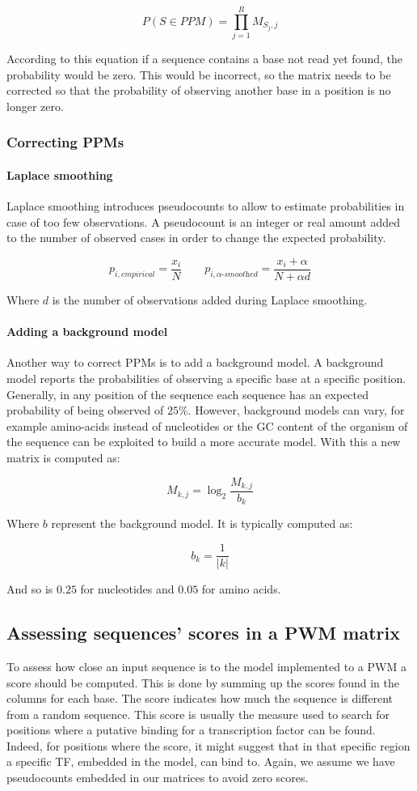 		$$P(S \in PPM) = \prod\limits_{j=1}^R M_{S_j, j}$$

		According to this equation if a sequence contains a base not read yet found, the probability would be zero.
		This would be incorrect, so the matrix needs to be corrected so that the probability of observing another base in a position is no longer zero.

		\subsubsection{Correcting PPMs}

			\paragraph{Laplace smoothing}
			Laplace smoothing introduces pseudocounts to allow to estimate probabilities in case of too few observations.
			A pseudocount is an integer or real amount added to the number of observed cases in order to change the expected probability.

			$$p_{i,\textit{empirical}} = \frac{x_i}{N} \qquad p_{i,\alpha\textit{-smoothed}} = \frac{x_i + \alpha}{N + \alpha d}$$

			Where $d$ is the number of observations added during Laplace smoothing.

			\paragraph{Adding a background model}
			Another way to correct PPMs is to add a background model.
			A background model reports the probabilities of observing a specific base at a specific position.
			Generally, in any position of the sequence each sequence has an expected probability of being observed of $25\%$.
			However, background models can vary, for example amino-acids instead of nucleotides or the GC content of the organism of the sequence can be exploited to build a more accurate model.
			With this a new matrix is computed as:

			$$M_{k,j} = \log_2\frac{M_{k,j}}{b_k}$$


			Where $b$ represent the background model.
			It is typically computed as:

			$$b_k = \frac{1}{|k|}$$

			And so is $0.25$ for nucleotides and $0.05$ for amino acids.

		\subsection{Assessing sequences' scores in a PWM matrix}
		To assess how close an input sequence is to the model implemented to a PWM a score should be computed.
		This is done by summing up the scores found in the columns for each base.
		The score indicates how much the sequence is different from a random sequence.
		This score is usually the measure used to search for positions where a putative binding for a transcription factor can be found.
		Indeed, for positions where the score, it might suggest that in that specific region a specific TF, embedded in the model, can bind to.
		Again, we assume we have pseudocounts embedded in our matrices to avoid zero scores.

